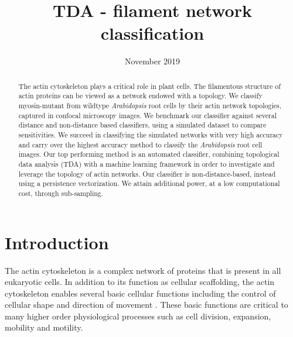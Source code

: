 \documentclass[10pt]{article}
\title{TDA - filament network classification}
\date{November 2019}
\begin{document}
\maketitle

\begin{abstract}

The actin cytoskeleton plays a critical role in plant cells. The filamentous structure of actin proteins can be viewed as a network endowed with a topology. We classify myosin-mutant from wildtype \textit{Arabidopsis} root cells by their actin network topologies, captured in confocal microscopy images. We benchmark our classifier against several distance and non-distance based classifiers, using a simulated dataset to compare sensitivities. We succeed in classifying the simulated networks with very high accuracy and carry over the highest accuracy method to classify the \textit{Arabidopsis} root cell images. Our top performing method is an automated classifier, combining topological data analysis (TDA) with a machine learning framework in order to investigate and leverage the topology of actin networks. Our classifier is non-distance-based, instead using a persistence vectorization. We attain additional power, at a low computational cost, through sub-sampling.

    
\end{abstract}

\section{Introduction}
The actin cytoskeleton is a complex network of proteins that is present in all eukaryotic cells. In addition to its function as cellular scaffolding, the actin cytoskeleton enables several basic cellular functions including the control of cellular shape and direction of movement \cite{thomas2009actin}. These basic functions are critical to many higher order physiological processes such as cell division, expansion, mobility and motility\cite{freedman2017versatile}. 
\end{document}
